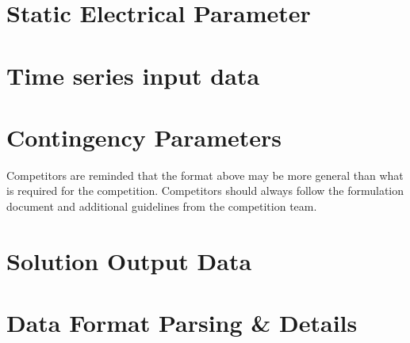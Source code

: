 \documentclass{article}
\begin{document}
\section{Static Electrical Parameter}
\label{sec:format_spec}



\section{Time series input data}


\section{Contingency Parameters}    


Competitors are reminded that the format above may be more general than
what is required for the competition.
Competitors should always
follow the formulation document and additional guidelines from the competition team.





\section{Solution Output Data}


\section{Data Format Parsing \& Details}

\end{document}
